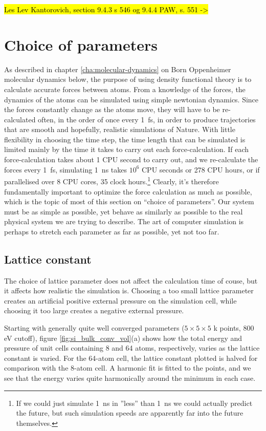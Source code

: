 \documentclass[11pt,bibliography=totoc,index=totoc]{scrbook}   %
\newcommand{\comment}[1]{\hl{#1}}
\begin{document}
\comment{Les Lev Kantorovich, section 9.4.3 s 546 og 9.4.4 PAW, s. 551 ->}

\section{Choice of parameters}

As described in chapter \ref{cha:molecular-dynamics} on Born Oppenheimer molecular dynamics below, the purpose of using density functional theory is to calculate accurate forces between atoms. 
From a knowledge of the forces, the dynamics of the atoms can be simulated using simple newtonian dynamics.
Since the forces constantly change as the atoms move, they will have to be re-calculated often, 
in the order of once every 1~fs, in order to produce trajectories that are smooth and hopefully, realistic simulations of Nature.
With little flexibility in choosing the time step, the time length that can be simulated is limited mainly by the time it takes to carry out each force-calculation.
If each force-calculation takes about 1 CPU second to carry out, and we re-calculate the forces every 1~fs, simulating 1~ns takes $10^6$ CPU seconds or 278 CPU hours, or if parallelised over 8 CPU cores, 35 clock hours.\footnote{If we could just simulate 1~ns in ''less'' than 1~ns we could actually predict the future, but such simulation speeds are apparently far into the future themselves.}
Clearly, it's therefore fundamentally important to optimize the force calculation as much as possible, which is the topic of most of this section on ``choice of parameters''.
Our system must be as simple as possible, yet behave as similarly as possible to the real physical system we are trying to describe. 
The art of computer simulation is perhaps to stretch each parameter as far as possible, yet not too far. 

\subsection{Lattice constant}

The choice of lattice parameter does not affect the calculation time of couse, but it affects how realistic the simulation is. 
Choosing a too small lattice parameter creates an artificial positive external pressure on the simulation cell, while choosing it too large
creates a negative external pressure.

Starting with generally quite well converged parameters ($5\times 5\times 5$ k points, 800 eV cutoff), figure \ref{fig:si_bulk_conv_vol}(a) shows how the total energy and pressure of unit cells containing 8 and 64 atoms, respectively, varies as the lattice constant is varied. 
For the 64-atom cell, the lattice constant plotted is halved for comparison with the 8-atom cell.
A harmonic fit is fitted to the points, and we see that the energy varies quite harmonically around the minimum in each case.
\end{document}
